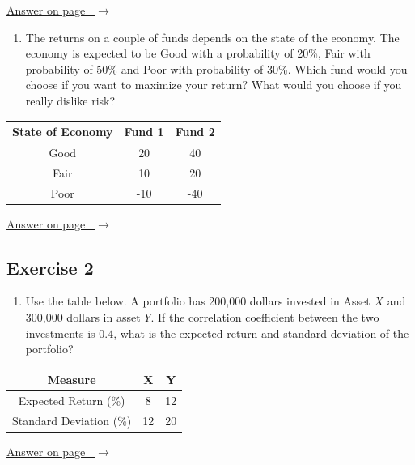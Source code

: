 \documentclass[
  11pt,
  letterpaper,
  DIV=11,
  numbers=noendperiod,
  oneside,
  open=any]{scrreprt}
\providecommand{\tightlist}{%
  \setlength{\itemsep}{0pt}\setlength{\parskip}{0pt}}\usepackage{longtable,booktabs,array}
\newcommand{\bsanswerref}[1]{%
  \par\nopagebreak\hypertarget{q-#1}{}\label{q-#1}%
  {\raggedleft\sffamily\footnotesize\hyperlink{a-#1}{\textcolor{bsaccent}{Answer on page \pageref{a-#1}\ $\rightarrow$}}\par}%
  \medskip}
\begin{document}
\bsanswerref{bsans85}

\begin{enumerate}
\def\labelenumi{\arabic{enumi}.}
\setcounter{enumi}{2}
\tightlist
\item
  The returns on a couple of funds depends on the state of the economy.
  The economy is expected to be Good with a probability of 20\%, Fair
  with probability of 50\% and Poor with probability of 30\%. Which fund
  would you choose if you want to maximize your return? What would you
  choose if you really dislike risk?
\end{enumerate}

\begin{center}
\begin{tabular}{ccc}
\toprule
State of Economy & Fund 1 & Fund 2 \\
\midrule
Good & 20 & 40 \\
Fair & 10 & 20 \\
Poor & -10 & -40 \\
\bottomrule
\end{tabular}
\end{center}

\bsanswerref{bsans86}

\subsection*{Exercise 2}\label{exercise-2-8}

\begin{enumerate}
\def\labelenumi{\arabic{enumi}.}
\tightlist
\item
  Use the table below. A portfolio has 200,000 dollars invested in Asset
  \(X\) and 300,000 dollars in asset \(Y\). If the correlation
  coefficient between the two investments is \(0.4\), what is the
  expected return and standard deviation of the portfolio?
\end{enumerate}

\begin{center}
\begin{tabular}{ccc}
\toprule
Measure & X & Y \\
\midrule
Expected Return (\%) & 8 & 12 \\
Standard Deviation (\%) & 12 & 20 \\
\bottomrule
\end{tabular}
\end{center}

\bsanswerref{bsans87}
\end{document}
